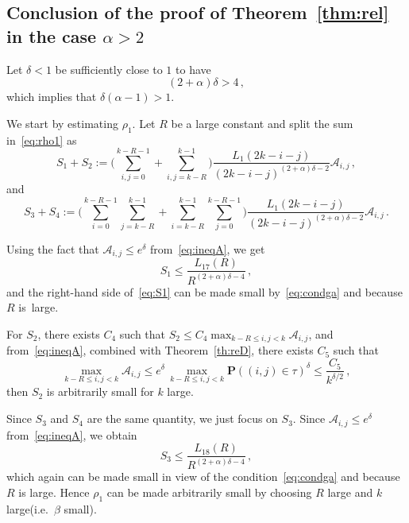 \documentclass[10pt]{amsart}
\theoremstyle{definition}\newtheorem{defi}[theo]{Definition}\newtheorem{rema}[theo]{Remark}\newtheorem{exam}[theo]{Example}\newtheorem{exem}[theo]{Example}\newtheorem{nota}[theo]{Notation}
\newcommand{\ga}{\alpha}
\newcommand{\gb}{\beta}
\newcommand{\gd}{\delta}
\newcommand{\cA}{\ensuremath{\mathcal{A}}}
\newcommand{\bP}{\ensuremath{\mathbf{P}}}
\begin{document}
\subsection{Conclusion of the proof of Theorem~\ref{thm:rel} in the case \texorpdfstring{$\ga > 2$}{ga > 2}}\label{sec:ga2}


Let $\delta < 1$ be sufficiently close to $1$ to have
\begin{equation}\label{eq:condga}
(2+\ga) \delta > 4\,,
\end{equation}
which implies that $\gd(\ga-1) >1$.


We start by estimating $\rho_1$. Let $R$ be a large constant and split the sum in~\eqref{eq:rho1} as
\begin{equation}
S_1+ S_2 :=\bigg(\sum_{i,j=0}^{k-R-1} + \sum_{i,j=k-R}^{k-1} \bigg) \frac{L_1(2k -i -j)}{(2k -i-j)^{(2+\ga) \delta - 2}} \cA_{i,j}\,,
\end{equation}
and
\begin{equation}
S_3+S_4 := \bigg(\sum_{i=0}^{k-R-1} \sum_{j=k-R}^{k-1} + \sum_{i=k-R}^{k-1} \sum_{j=0}^{k-R-1} \bigg) \frac{L_1(2k -i -j)}{(2k -i-j)^{(2+\ga) \delta - 2}} \cA_{i,j}\,.
\end{equation}


Using the fact that $\cA_{i,j} \le e^\delta$ from~\eqref{eq:ineqA}, we get
\begin{equation}\label{eq:S1}
S_1 \le \frac{L_{17}(R)}{R^{(2+\ga) \delta-4}}\,,
\end{equation}
and the right-hand side of~\eqref{eq:S1} can be made small by~\eqref{eq:condga} and because $R$ is~large.

For $S_2$, there exists $C_4$ such that $S_2 \le C_4 \max_{k - R \le i,j < k} \cA_{i,j} $, and from~\eqref{eq:ineqA}, combined with Theorem~\ref{th:reD}, there exists $C_5$ such that
\begin{equation}
\max_{k - R \le i,j < k} \cA_{i,j} \le e^{\delta}\,\max_{k - R \le i,j < k} \bP((i,j) \in \tau) ^\delta \le \frac{C_5}{k^{\delta/2}}\,,
\end{equation}
then $S_2$ is arbitrarily small for $k$ large.

Since $S_3$ and $S_4$ are the same quantity, we just focus on $S_3$. Since $\cA_{i,j} \le e^ \delta$ from~\eqref{eq:ineqA}, we obtain
\begin{equation}
S_3 \le \frac{L_{18}(R)}{R^{(2+\ga) \delta-4}}\,,
\end{equation}
which again can be made small in view of the condition~\eqref{eq:condga} and because $R$ is large. Hence $\rho_1$ can be made arbitrarily small by choosing $R$ large and $k$ large\linebreak(i.e.~$\gb$ small).
\end{document}
